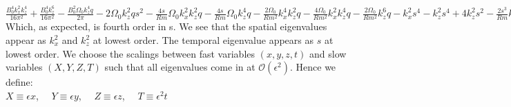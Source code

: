 \documentclass[letterpaper,12pt]{article}
\begin{document}
$\frac{B_{0}^{4} k_{x}^{2} k_{z}^{4}}{16 \pi^{2}} + \frac{B_{0}^{4} k_{z}^{6}}{16 \pi^{2}} - \frac{B_{0}^{2} \Omega_{0} k_{z}^{4} q}{2 \pi} - 2 \Omega_{0} k_{z}^{2} q s^{2} - \frac{4 s}{Rm} \Omega_{0} k_{x}^{2} k_{z}^{2} q - \frac{4 s}{Rm} \Omega_{0} k_{z}^{4} q - \frac{2 \Omega_{0}}{Rm^{2}} k_{x}^{4} k_{z}^{2} q - \frac{4 \Omega_{0}}{Rm^{2}} k_{x}^{2} k_{z}^{4} q - \frac{2 \Omega_{0}}{Rm^{2}} k_{z}^{6} q - k_{x}^{2} s^{4} - k_{z}^{2} s^{4} + 4 k_{z}^{2} s^{2} - \frac{2 s^{3}}{Rm} k_{x}^{4} - \frac{4 s^{3}}{Rm} k_{x}^{2} k_{z}^{2} + \frac{8 s}{Rm} k_{x}^{2} k_{z}^{2} - \frac{2 s^{3}}{Rm} k_{z}^{4} + \frac{8 s}{Rm} k_{z}^{4} - \frac{k_{x}^{6} s^{2}}{Rm^{2}} - \frac{3 s^{2}}{Rm^{2}} k_{x}^{4} k_{z}^{2} + \frac{4 k_{x}^{4}}{Rm^{2}} k_{z}^{2} - \frac{3 s^{2}}{Rm^{2}} k_{x}^{2} k_{z}^{4} + \frac{8 k_{x}^{2}}{Rm^{2}} k_{z}^{4} - \frac{k_{z}^{6} s^{2}}{Rm^{2}} + \frac{4 k_{z}^{6}}{Rm^{2}} - \frac{2 s^{3}}{Re} k_{x}^{4} - \frac{4 s^{3}}{Re} k_{x}^{2} k_{z}^{2} - \frac{2 s^{3}}{Re} k_{z}^{4} - \frac{4 k_{x}^{6} s^{2}}{Re Rm} - \frac{12 k_{x}^{4} k_{z}^{2} s^{2}}{Re Rm} - \frac{12 k_{x}^{2} k_{z}^{4} s^{2}}{Re Rm} - \frac{4 k_{z}^{6} s^{2}}{Re Rm} - \frac{2 k_{x}^{8} s}{Re Rm^{2}} - \frac{8 k_{x}^{6} k_{z}^{2} s}{Re Rm^{2}} - \frac{12 k_{x}^{4} k_{z}^{4} s}{Re Rm^{2}} - \frac{8 k_{x}^{2} k_{z}^{6} s}{Re Rm^{2}} - \frac{2 k_{z}^{8} s}{Re Rm^{2}} - \frac{k_{x}^{6} s^{2}}{Re^{2}} - \frac{3 s^{2}}{Re^{2}} k_{x}^{4} k_{z}^{2} - \frac{3 s^{2}}{Re^{2}} k_{x}^{2} k_{z}^{4} - \frac{k_{z}^{6} s^{2}}{Re^{2}} - \frac{2 k_{x}^{8} s}{Re^{2} Rm} - \frac{8 k_{x}^{6} k_{z}^{2} s}{Re^{2} Rm} - \frac{12 k_{x}^{4} k_{z}^{4} s}{Re^{2} Rm} - \frac{8 k_{x}^{2} k_{z}^{6} s}{Re^{2} Rm} - \frac{2 k_{z}^{8} s}{Re^{2} Rm} - \frac{k_{x}^{10}}{Re^{2} Rm^{2}} - \frac{5 k_{x}^{8} k_{z}^{2}}{Re^{2} Rm^{2}} - \frac{10 k_{x}^{6} k_{z}^{4}}{Re^{2} Rm^{2}} - \frac{10 k_{x}^{4} k_{z}^{6}}{Re^{2} Rm^{2}} - \frac{5 k_{x}^{2} k_{z}^{8}}{Re^{2} Rm^{2}} - \frac{k_{z}^{10}}{Re^{2} Rm^{2}}$ \\

Which, as expected, is fourth order in s. We see that the spatial eigenvalues appear as $k_x^2$ and $k_z^2$ at lowest order. The temporal eigenvalue appears as $s$ at lowest order. We choose the scalings between fast variables $(x, y, z, t)$ and slow variables $(X, Y, Z, T)$ such that all eigenvalues come in at $\mathcal{O}(\epsilon^2)$. Hence we define: \\

\noindent $X \equiv \epsilon x$, \, \, $Y \equiv \epsilon y$, \, \, $Z \equiv \epsilon z$, \, \, $T \equiv \epsilon^2 t$ \\
\end{document}
